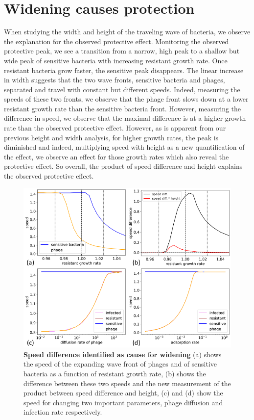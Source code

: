\section{Widening causes protection}
When studying the width and height of the traveling wave of bacteria, we observe the explanation for the observed protective effect. Monitoring the observed protective peak, we see a transition from a narrow, high peak to a shallow but wide peak of sensitive bacteria with increasing resistant growth rate. Once resistant bacteria grow faster, the sensitive peak disappears. The linear increase in width suggests that the two wave fronts, sensitive bacteria and phages, separated and travel with constant but different speeds. Indeed, measuring the speeds of these two fronts, we observe that the phage front slows down at a lower resistant growth rate than the sensitive bacteria front. However, measuring the difference in speed, we observe that the maximal difference is at a higher growth rate than the observed protective effect. However, as is apparent from our previous height and width analysis, for higher growth rates, the peak is diminished and indeed, multiplying speed with height as a new quantification of the effect, we observe an effect for those growth rates which also reveal the protective effect. So overall, the product of speed difference and height explains the observed protective effect. 
\begin{figure}
\centering
\includegraphics[width=\linewidth]{graphics/2025_09_26_phages_fig4.png}
\caption{\textbf{Speed difference identified as cause for widening} (a) shows the speed of the expanding wave front of phages and of sensitive bacteria as a function of resistant growth rate, (b) shows the difference between these two speeds and the new measurement of the product between speed difference and height, (c) and (d) show the speed for changing two important parameters, phage diffusion and infection rate respectively.}
\label{fig:results_speed_height}
\end{figure}

